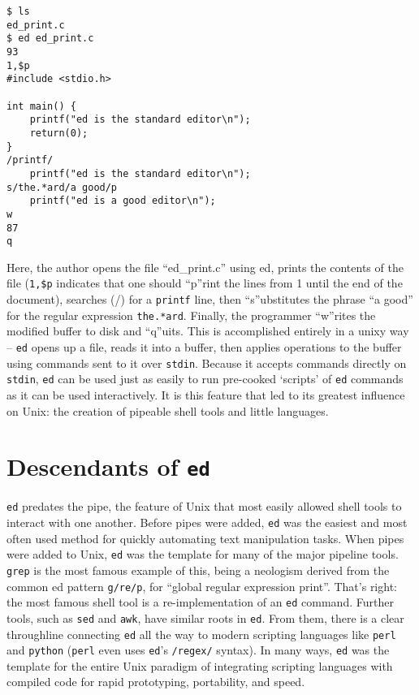 \documentclass[12pt]{article}
\begin{document}
\begin{lstlisting}
$ ls
ed_print.c
$ ed ed_print.c
93
1,$p
#include <stdio.h>

int main() {
    printf("ed is the standard editor\n");
    return(0);
}
/printf/
    printf("ed is the standard editor\n");
s/the.*ard/a good/p
    printf("ed is a good editor\n");
w
87
q
\end{lstlisting}

Here, the author opens the file ``ed\_print.c'' using ed,
prints the contents of the file (\lstinline{1,$p} indicates
that one should ``p''rint the lines from 1 until the end of the document),
searches (/) for a \lstinline{printf} line,
then ``s''ubstitutes the phrase ``a good'' for the regular
expression \lstinline{the.*ard}.
Finally, the programmer ``w''rites the modified buffer to disk and ``q''uits.
This is accomplished entirely in a unixy way -- \lstinline{ed} opens
up a file, reads it into a buffer, then applies operations to the buffer using commands
sent to it over \lstinline{stdin}. Because it accepts commands
directly on \lstinline{stdin}, \lstinline{ed} can be used just
as easily to run pre-cooked `scripts' of \lstinline{ed} commands
as it can be used interactively. It is this feature that
led to its greatest influence on Unix: the creation of pipeable
shell tools and little languages.

\section{Descendants of \lstinline{ed}}

\lstinline{ed} predates the pipe, the feature of Unix that most easily allowed shell
tools to interact with one another.
Before pipes were added, \lstinline{ed} was the easiest and most
often used method for quickly automating text manipulation tasks.
When pipes were added to Unix, \lstinline{ed} was the template for many
of the major pipeline tools.
\lstinline{grep} is the most famous example of this, being a neologism derived
from the common ed pattern \lstinline{g/re/p}, for ``global regular expression print''.
That's right: the most famous shell tool is a re-implementation of an \lstinline{ed}
command. Further tools, such as \lstinline{sed} and \lstinline{awk}, have similar
roots in \lstinline{ed}. From them, there is a clear throughline connecting
\lstinline{ed} all the way to modern scripting languages like \lstinline{perl} and
\lstinline{python} (\lstinline{perl} even uses \lstinline{ed}'s \lstinline{/regex/} syntax).
In many ways, \lstinline{ed} was the template for the entire Unix paradigm of integrating scripting languages
with compiled code for rapid prototyping, portability, and speed.
\end{document}

